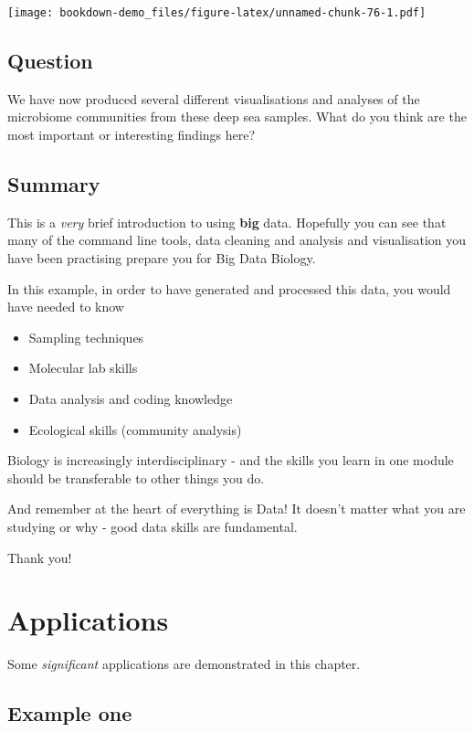 \documentclass[
]{book}
\providecommand{\tightlist}{%
  \setlength{\itemsep}{0pt}\setlength{\parskip}{0pt}}
\begin{document}
\texttt{[image: bookdown-demo\_files/figure-latex/unnamed-chunk-76-1.pdf]}

\hypertarget{question}{%
\section{Question}\label{question}}

We have now produced several different visualisations and analyses of the microbiome communities from these deep sea samples.
What do you think are the most important or interesting findings here?

\hypertarget{summary-3}{%
\section{Summary}\label{summary-3}}

This is a \emph{very} brief introduction to using \textbf{big} data. Hopefully you can see that many of the command line tools, data cleaning and analysis and visualisation you have been practising prepare you for Big Data Biology.

In this example, in order to have generated and processed this data, you would have needed to know

\begin{itemize}
\tightlist
\item
  Sampling techniques
\item
  Molecular lab skills
\item
  Data analysis and coding knowledge
\item
  Ecological skills (community analysis)
\end{itemize}

Biology is increasingly interdisciplinary - and the skills you learn in one module should be transferable to other things you do.

And remember at the heart of everything is Data! It doesn't matter what you are studying or why - good data skills are fundamental.

Thank you!

\hypertarget{applications}{%
\chapter{Applications}\label{applications}}

Some \emph{significant} applications are demonstrated in this chapter.

\hypertarget{example-one}{%
\section{Example one}\label{example-one}}
\end{document}
